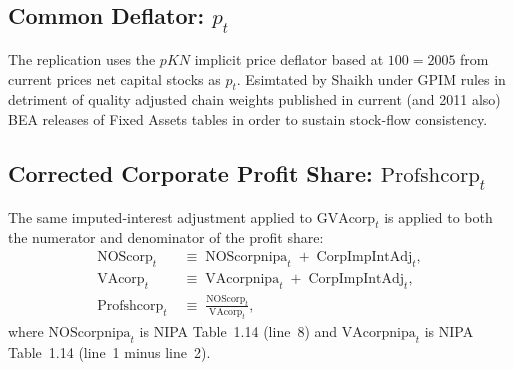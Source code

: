 \subsection{Common Deflator: \texorpdfstring{$p_t$}{p\_t}}

The replication uses the $pKN$ implicit price deflator based at $100 = 2005$ from current prices net capital stocks as $p_t$. Esimtated by Shaikh under GPIM rules in detriment of quality adjusted chain weights published in current (and 2011 also) BEA releases of Fixed Assets tables in order to sustain stock-flow consistency. 


\subsection{Corrected Corporate Profit Share: \texorpdfstring{$\text{Profshcorp}_t$}{Profshcorp}}

The same imputed-interest adjustment applied to $\text{GVAcorp}_t$ is
applied to both the numerator and denominator of the profit share:
%
\begin{align}
	\text{NOScorp}_t
	&\;\equiv\; \text{NOScorpnipa}_t \;+\; \text{CorpImpIntAdj}_t,
	\label{eq:app_nos} \\
	\text{VAcorp}_t
	&\;\equiv\; \text{VAcorpnipa}_t \;+\; \text{CorpImpIntAdj}_t,
	\label{eq:app_va} \\
	\text{Profshcorp}_t
	&\;\equiv\; \frac{\text{NOScorp}_t}{\text{VAcorp}_t},
	\label{eq:app_profshcorp}
\end{align}
%
where $\text{NOScorpnipa}_t$ is NIPA Table~1.14 (line~8) and
$\text{VAcorpnipa}_t$ is NIPA Table~1.14 (line~1 minus line~2).